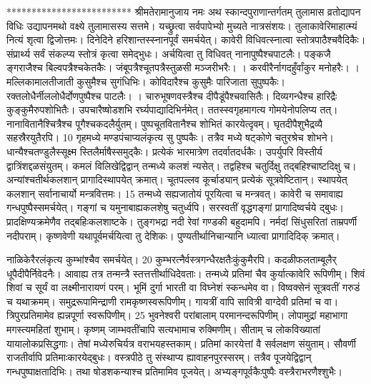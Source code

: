 *************************
श्रीमतेरामानुजाय नमः अथ स्कान्दपुराणान्तर्गतम्
तुलामास व्रतोद्यापन विधिः उद्यापनमथो वक्ष्ये तुलामासस्य सत्तमे।
 यच्छ्रुत्वा सर्वपापेभ्यो मुच्यते नात्रसंशयः।
 तुलाकावेरिमाहात्म्यं नित्यं शृत्वा द्विजोत्तमः।
 दिनेदिने हरिशान्तस्स्नानपूर्वं समर्चयेत्।
 कावेरी विधिवत्स्नात्वा स्तोत्रपाठैश्चवैदिकैः।
 संप्रार्थ्य सर्वं संकल्प्य स्तोत्रं कृत्वा समेद्भुधः।
 अर्चयित्वा तु विधिवत् नानापुष्पैश्चपाटलैः।
 पङ्कजै ङ्गराजैश्च बिल्वपत्रैश्चकेतकैः।
 जंबूपत्रैश्चूतपत्रैस्तुळसी मञ्जरीभरैः।
 ।
 करवीरैर्नागदहुँर्वांकुर मनोहरैः।
 ।
 मल्लिकामालतीजाती कुसुमैश्च सुगंधिभिः।
 कोविदारैश्च कुसुमैः पारिजाता सुपुष्पकैः।
 रक्तलोधैर्नीललोधैर्दोणपुष्पैश्च पाटलैः।
 ।
 चारुभूषणवस्त्रैश्च दीपैडूंपैश्चवासितैः।
 दिव्यगन्धैश्च हारिद्रैः कुङ्कुमैरुपशोभितैः।
 उपचारैष्षोडशभि रर्घ्यपाद्यादिभिर्नमेत्।
 ततस्स्वगृहमागत्य गोमयेनोपलिप्य तत्।
 नानावितानैश्चित्रैश्च पूगैश्चकदलैर्युतम्।
 पुष्पचूतवितानैश्च शोभितं कारयेत्दृवम्।
 घृतदीपैशुभैद्रव्यै सहस्रैरयुतैरपि।
 10 गृहमध्ये मण्डपंचाप्यलंकृत्य सु पुष्पकैः।
 तत्रैव मध्ये षट्कोणे चतुरश्रेच शोभने।
 धान्यैश्चतण्डुलैस्सूक्ष्म स्तिलैर्माषैस्समुद्कैः।
 प्रत्येकं भारमात्रेण तदर्वातदर्धकैः।
 उपर्युपरि विस्तीर्य द्वात्रिंशद्दळसंयुतम्।
 कमलं विलिखेद्विद्वान् तन्मध्ये कलशं न्यसेत्।
 तद्वहिश्च चतुर्दिक्षु तद्बहिश्चाष्टदिक्षु च।
 अन्यांश्चतीर्थकलशान् प्रागादिस्थापयेत् क्रमात्।
 चूतपल्लव कूर्चाड्यान् प्रत्येकं सूत्रवेष्टितान्।
 स्थापयेत् कलशान् सर्वानाचार्यो मन्त्रवित्तमः।
 15 तन्मध्ये सह्यजातोयं पूरयित्वा च मन्त्रवत्।
 कावेरी च समावाह्य गन्धपुष्पैस्समर्चयेत्।
 गङ्गां च यमुनाबाह्यकलशेषु चतुर्ध्वपि।
 सरस्वतीं वृद्धगङ्गां प्रागादिष्वर्चये द्बुधः।
 प्रादक्षिण्यक्रमेणैव तद्बहिःकलशाष्टके।
 तुङ्गभद्रा नदी रेवां गण्डकी बहुदामपि।
 नर्मदां सिंधुसरितां ताम्रपर्णी नदीपराम्।
 कृष्णवेणी यथापूर्वमर्चयित्वा तु देशिकः।
 पुण्यतीर्थानिचान्यानि ध्यात्वा प्रागादिदिक् क्रमात्।
 
नाळिकेरैरलंकृत्य कुम्भांश्चैव समर्चयेत्।
 20 कुम्भरत्नैर्वस्त्रगन्धैरक्षतैःकुंकुमैरपि।
 कदळीफलताम्बूलैर् धूपैदीपैर्निवेदनैः।
 आवाह्य तत्र तन्मन्त्रै स्तत्तत्तीर्थाधिदेवताः।
 तन्मध्ये प्रतिमां चैव कुर्यात्कावेरि रूपिणीम्।
 शिवं शिवां च सूर्यं वा लक्ष्मीनारायणं परम्।
 भूमिं दुर्गा भारती वा विघ्नेशं स्कन्धमेव वा।
 विष्वक्सेनं सूत्रवतीं गरुडं च यथाक्रमम्।
 समुद्ररूपामिन्द्राणी रामकृष्णस्वरूपिणीम्।
 गायत्रीं वापि सावित्री वाग्देवी प्रतिमां च वा।
 त्रिपुरप्रतिमामेव ह्यन्नपूर्णा स्वरूपिणीम्।
 25 भुवनेश्वरी परांबालाम् परमानन्दरूपिणीम्।
 लोपामुद्रां महाभागा मगस्त्यमहितां शुभाम्।
 कृष्णम् जाम्भवतींचापि सत्यभामाच रुक्मिणीम्।
 सीताम् च लोकविख्यातां यायालोकप्रसिद्धगाः।
 तेषां मध्येरुचिर्यत्र वराभयहस्तकाम्।
 प्रतिमां कारयेत्तां वै सर्वलक्षण संयुताम्।
 सौवर्णी राजतीर्वापि प्रतिमाःकारयेद्बुधः।
 वस्त्रपीठे तु संस्थाप्य ह्यावाहनपुरस्सरम्।
 तत्रैव पूजयेद्विद्वान् गन्धपुष्पाक्षतादिभिः।
 तथा षोडशकन्याश्च प्रतिमामिव पूजयेत्।
 अभ्यङ्गपूर्वकैःपुष्पैः वस्त्रैराभरणैश्शुभैः।
 
